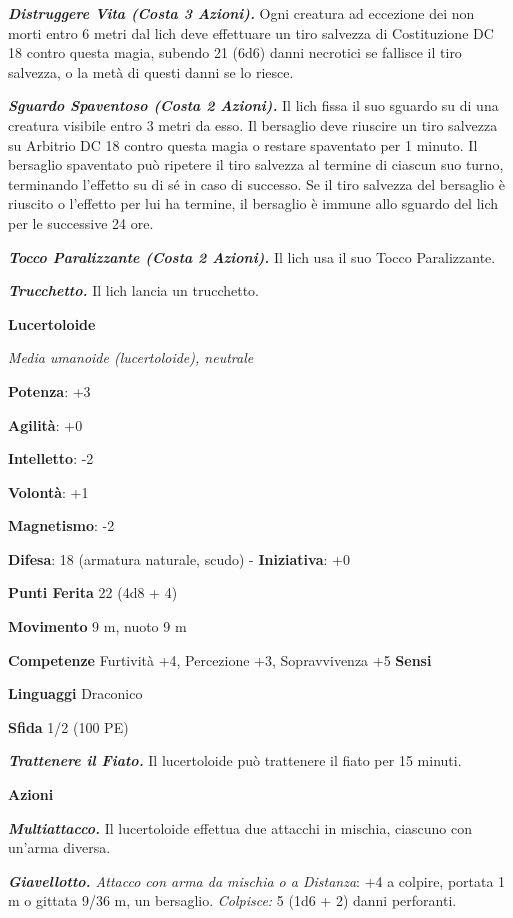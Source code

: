 \begin{multicols}{2}
\emph{\textbf{Distruggere Vita (Costa 3 Azioni).}} Ogni creatura ad
eccezione dei non morti entro 6 metri dal lich deve effettuare un tiro
salvezza di Costituzione DC 18 contro questa magia, subendo 21 (6d6)
danni necrotici se fallisce il tiro salvezza, o la metà di questi danni
se lo riesce.

\emph{\textbf{Sguardo Spaventoso (Costa 2 Azioni).}} Il lich fissa il
suo sguardo su di una creatura visibile entro 3 metri da esso. Il
bersaglio deve riuscire un tiro salvezza su Arbitrio DC 18 contro questa
magia o restare spaventato per 1 minuto. Il bersaglio spaventato può
ripetere il tiro salvezza al termine di ciascun suo turno, terminando
l'effetto su di sé in caso di successo. Se il tiro salvezza del
bersaglio è riuscito o l'effetto per lui ha termine, il bersaglio è
immune allo sguardo del lich per le successive 24 ore.

\emph{\textbf{Tocco Paralizzante (Costa 2 Azioni).}} Il lich usa il suo
Tocco Paralizzante.

\emph{\textbf{Trucchetto.}} Il lich lancia un trucchetto.

\textbf{Lucertoloide}

\emph{Media umanoide (lucertoloide), neutrale}

\textbf{Potenza}: +3

\textbf{Agilità}: +0

\textbf{Intelletto}: -2

\textbf{Volontà}: +1

\textbf{Magnetismo}: -2

\textbf{Difesa}: 18 (armatura naturale, scudo) - \textbf{Iniziativa}: +0

\textbf{Punti Ferita} 22 (4d8 + 4)

\textbf{Movimento} 9 m, nuoto 9 m

\textbf{Competenze} Furtività +4, Percezione +3, Sopravvivenza +5
\textbf{Sensi} 

\textbf{Linguaggi} Draconico

\textbf{Sfida} 1/2 (100 PE)\smallskip

\emph{\textbf{Trattenere il Fiato.}} Il lucertoloide può trattenere il
fiato per 15 minuti.

\smallskip\textbf{Azioni}

\emph{\textbf{Multiattacco.}} Il lucertoloide effettua due attacchi in
mischia, ciascuno con un'arma diversa.

\emph{\textbf{Giavellotto.} Attacco con arma da mischia o a Distanza}:
+4 a colpire, portata 1 m o gittata 9/36 m, un bersaglio.
\emph{Colpisce:} 5 (1d6 + 2) danni perforanti.


\end{multicols}
